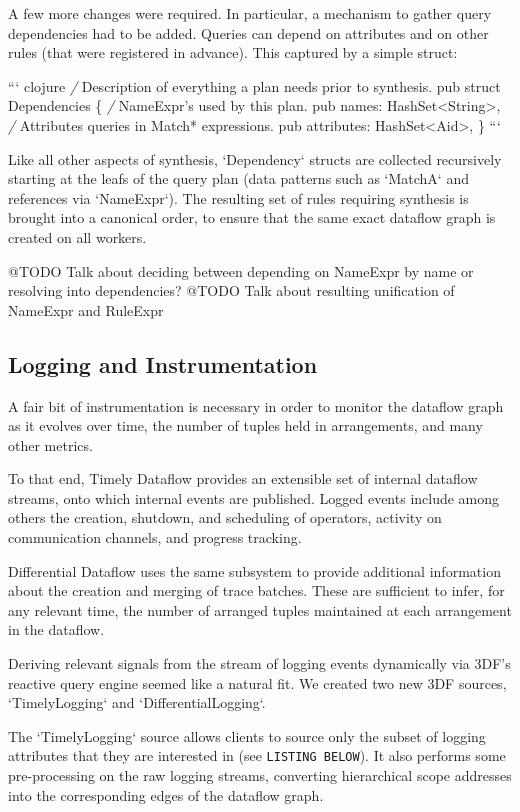 \documentclass[../index.tex]{subfiles}
\begin{document}
A few more changes were required. In particular, a mechanism to gather
query dependencies had to be added. Queries can depend on attributes
and on other rules (that were registered in advance). This captured by
a simple struct:

``` clojure
\emph{/} Description of everything a plan needs prior to synthesis.
pub struct Dependencies \{
    \emph{/} NameExpr's used by this plan.
    pub names: HashSet<String>,
    \emph{/} Attributes queries in Match* expressions.
    pub attributes: HashSet<Aid>,
\}
```

Like all other aspects of synthesis, `Dependency` structs are
collected recursively starting at the leafs of the query plan (data
patterns such as `MatchA` and references via `NameExpr`). The
resulting set of rules requiring synthesis is brought into a canonical
order, to ensure that the same exact dataflow graph is created on all
workers.

@TODO Talk about deciding between depending on NameExpr by name or resolving into dependencies?
@TODO Talk about resulting unification of NameExpr and RuleExpr

\subsection{Logging and Instrumentation}

A fair bit of instrumentation is necessary in order to monitor the
dataflow graph as it evolves over time, the number of tuples held in
arrangements, and many other metrics.

To that end, Timely Dataflow provides an extensible set of internal
dataflow streams, onto which internal events are published. Logged
events include among others the creation, shutdown, and scheduling of
operators, activity on communication channels, and progress tracking.

Differential Dataflow uses the same subsystem to provide additional
information about the creation and merging of trace batches. These are
sufficient to infer, for any relevant time, the number of arranged
tuples maintained at each arrangement in the dataflow.

Deriving relevant signals from the stream of logging events
dynamically via 3DF's reactive query engine seemed like a natural
fit. We created two new 3DF sources, `TimelyLogging` and
`DifferentialLogging`.

The `TimelyLogging` source allows clients to source only the subset of
logging attributes that they are interested in (see \texttt{LISTING
BELOW}). It also performs some pre-processing on the raw logging
streams, converting hierarchical scope addresses into the
corresponding edges of the dataflow graph.
\end{document}
